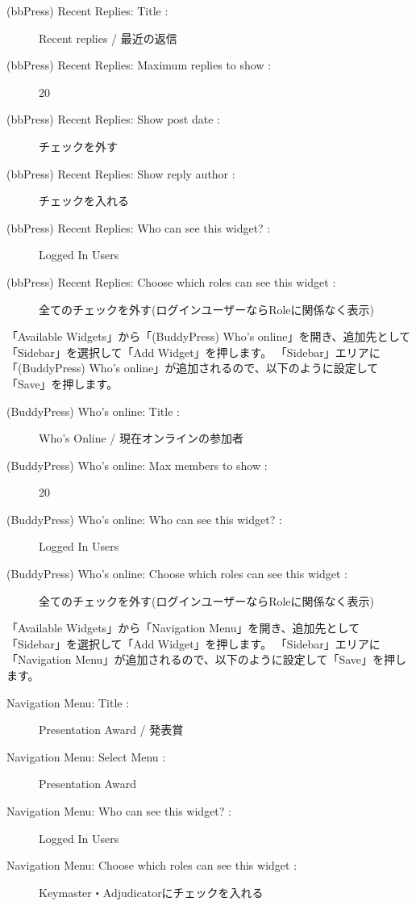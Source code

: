 \documentclass[titlepage,10pt,a4paper,uplatex]{jsbook}
\begin{document}
\begin{description}
\item[(bbPress) Recent Replies: Title : ] Recent replies / 最近の返信
\item[(bbPress) Recent Replies: Maximum replies to show : ] 20
\item[(bbPress) Recent Replies: Show post date : ] チェックを外す
\item[(bbPress) Recent Replies: Show reply author : ] チェックを入れる
\item[(bbPress) Recent Replies: Who can see this widget? : ] Logged In Users
\item[(bbPress) Recent Replies: Choose which roles can see this widget : ] 全てのチェックを外す(ログインユーザーならRoleに関係なく表示)
\end{description}

「Available Widgets」から「(BuddyPress) Who's online」を開き、追加先として「Sidebar」を選択して「Add Widget」を押します。
「Sidebar」エリアに「(BuddyPress) Who's online」が追加されるので、以下のように設定して「Save」を押します。

\begin{description}
\item[(BuddyPress) Who's online: Title : ] Who's Online / 現在オンラインの参加者
\item[(BuddyPress) Who's online: Max members to show : ] 20
\item[(BuddyPress) Who's online: Who can see this widget? : ] Logged In Users
\item[(BuddyPress) Who's online: Choose which roles can see this widget : ] 全てのチェックを外す(ログインユーザーならRoleに関係なく表示)
\end{description}

「Available Widgets」から「Navigation Menu」を開き、追加先として「Sidebar」を選択して「Add Widget」を押します。
「Sidebar」エリアに「Navigation Menu」が追加されるので、以下のように設定して「Save」を押します。

\begin{description}
\item[Navigation Menu: Title : ] Presentation Award / 発表賞
\item[Navigation Menu: Select Menu : ] Presentation Award
\item[Navigation Menu: Who can see this widget? : ] Logged In Users
\item[Navigation Menu: Choose which roles can see this widget : ] Keymaster・Adjudicatorにチェックを入れる
\end{description}
\end{document}
